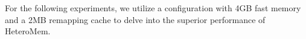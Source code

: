 For the following experiments, we utilize a configuration with 4GB fast memory and a 2MB remapping cache to delve into the superior performance of HeteroMem.



